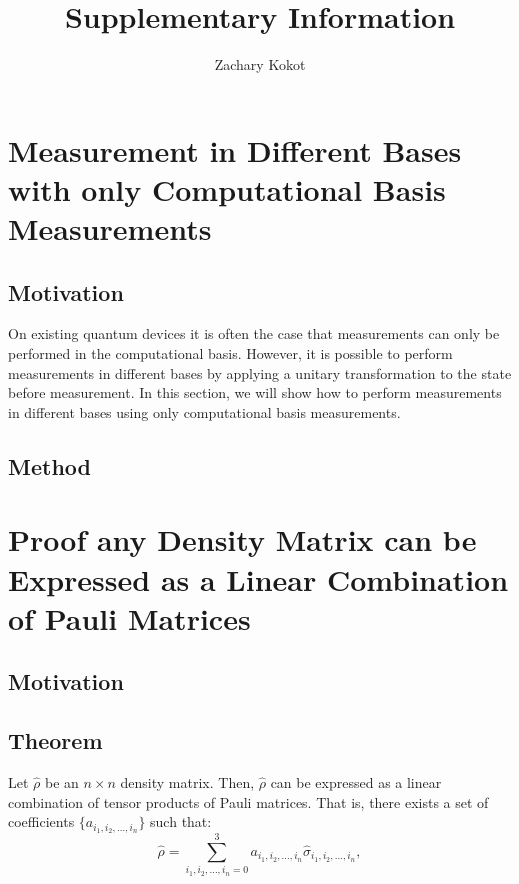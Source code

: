\documentclass[12pt]{article}
\author{Zachary Kokot}
\title{Supplementary Information}
\begin{document}
    \maketitle

    \tableofcontents

    \newpage

    \section{Measurement in Different Bases with only Computational Basis Measurements}
    \subsection{Motivation}
    On existing quantum devices it is often the case that measurements can only be performed in the computational basis. However, it is possible to perform measurements in different bases by applying a unitary transformation to the state before measurement. In this section, we will show how to perform measurements in different bases using only computational basis measurements.

    \subsection{Method}
    

    \section{Proof any Density Matrix can be Expressed as a Linear Combination of Pauli Matrices}
    \subsection{Motivation}
    
    \subsection{Theorem}
    Let $\hat{\rho}$ be an $n \times n$ density matrix. Then, $\hat{\rho}$ can be expressed as a linear combination of tensor products of Pauli matrices. That is, there exists a set of coefficients $\{a_{i_1, i_2, \dots, i_n}\}$ such that:
    \begin{equation}
        \hat{\rho} = \sum_{i_1,i_2,\dots,i_n = 0}^{3} a_{i_1, i_2, \dots, i_n} \hat{\sigma}_{i_1,i_2,\dots,i_n},
    \end{equation}
\end{document}
